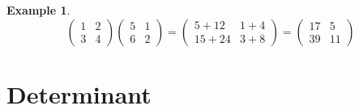 \documentclass[a4paper,11pt]{article}
\newtheorem{example}{Example}
\begin{document}
\begin{example}
$$
\begin{pmatrix}
1 & 2 \\
3 & 4
\end{pmatrix}
\begin{pmatrix}
5 & 1 \\ 6 & 2
\end{pmatrix}
=\begin{pmatrix}
5 + 12 & 1 + 4 \\
15 + 24 & 3 + 8
\end{pmatrix}
=\begin{pmatrix}
17 & 5 \\ 39 & 11
\end{pmatrix}
$$
\end{example}

\section*{Determinant}
\end{document}
